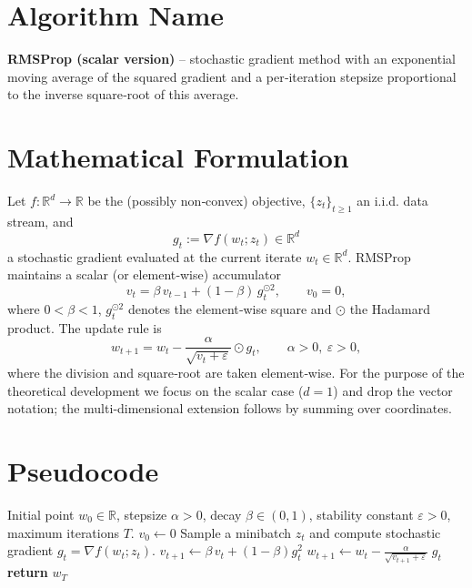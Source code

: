 \documentclass{article}
\newcommand{\R}{\mathbb{R}}
\begin{document}
\section*{Algorithm Name}
\textbf{RMSProp (scalar version)} – stochastic gradient method with an exponential moving average of the squared gradient and a per‑iteration stepsize proportional to the inverse square‑root of this average.

\section*{Mathematical Formulation}
Let $f:\R^{d}\rightarrow\R$ be the (possibly non‑convex) objective,
$\{z_{t}\}_{t\ge 1}$ an i.i.d. data stream, and 
\[
g_{t}:=\nabla f(w_{t};z_{t})\in\R^{d}
\]
a stochastic gradient evaluated at the current iterate $w_{t}\in\R^{d}$.
RMSProp maintains a scalar (or element‑wise) accumulator
\[
v_{t}= \beta\,v_{t-1}+(1-\beta)\,g_{t}^{\odot 2},\qquad v_{0}=0,
\tag{1}
\]
where $0<\beta<1$, $g_{t}^{\odot 2}$ denotes the element‑wise square
and $\odot$ the Hadamard product.  
The update rule is
\[
w_{t+1}= w_{t}-\frac{\alpha}{\sqrt{v_{t}+\varepsilon}}\odot g_{t},
\qquad \alpha>0,\ \varepsilon>0,
\tag{2}
\]
where the division and square‑root are taken element‑wise.
For the purpose of the theoretical development we focus on the
scalar case ($d=1$) and drop the vector notation; the multi‑dimensional
extension follows by summing over coordinates.

\section*{Pseudocode}
\begin{algorithm}[H]
\caption{RMSProp (scalar)}\label{alg:rmsprop}
\begin{algorithmic}[1]
\Require Initial point $w_{0}\in\R$, stepsize $\alpha>0$, decay $\beta\in(0,1)$, stability constant $\varepsilon>0$,
          maximum iterations $T$.
\State $v_{0}\gets 0$
    \State Sample a minibatch $z_{t}$ and compute stochastic gradient $g_{t}= \nabla f(w_{t};z_{t})$.
    \State $v_{t+1}\gets \beta\,v_{t}+(1-\beta)g_{t}^{2}$ \hfill{}
    \State $w_{t+1}\gets w_{t}-\displaystyle\frac{\alpha}{\sqrt{v_{t+1}+\varepsilon}}\;g_{t}$ \hfill{}
\EndFor
\State \textbf{return} $w_{T}$
\end{algorithmic}
\end{algorithm}
\end{document}
